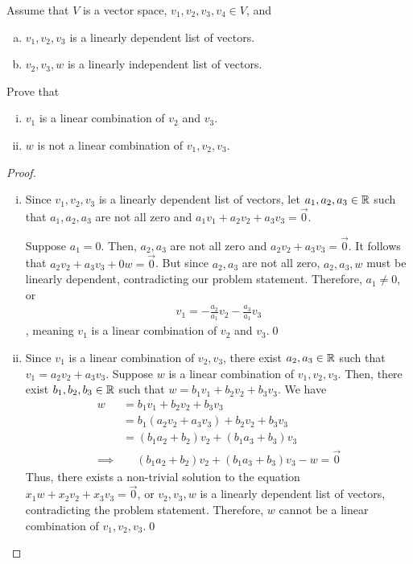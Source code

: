 \begin{question}
	\normalfont
	

	
	Assume that $V$ is a vector space, $v_1,v_2,v_3,v_4\in V$, and
	\begin{enumerate}[(a)]
		\item $v_1,v_2,v_3$ \hspace{.1cm} is a linearly dependent list of vectors.
		\item $v_2,v_3,w$ \hspace{.1cm} is a linearly independent list of vectors.
	\end{enumerate}
	Prove that
	\begin{enumerate}[(i)]
		\item $v_1$ is a linear combination of $v_2$ and $v_3$.
		\item $w$ is not a linear combination of $v_1, v_2, v_3$.
	\end{enumerate}

	
\end{question}
\renewcommand{\qedsymbol}{$\blacksquare$}
\begin{proof}
    \begin{enumerate}[(i)]
        \item Since $v_1,v_2,v_3$ is a linearly dependent list of vectors, let $a_1,a_2,a_3\in\mathbb R$ such that $a_1,a_2,a_3$ are not all zero and $a_1v_1+a_2v_2+a_3v_3=\vec{0}$.
        
        Suppose $a_1=0$. Then, $a_2,a_3$ are not all zero and $a_2v_2+a_3v_3=\vec{0}$. It follows that $a_2v_2+a_3v_3+0w=\vec{0}$. But since $a_2,a_3$ are not all zero, $a_2,a_3,w$ must be linearly dependent, contradicting our problem statement.
        Therefore, $a_1\not=0$, or 
        \[
            \begin{aligned}
                v_1=-\frac{a_2}{a_1}v_2-\frac{a_3}{a_1}v_3
            \end{aligned}
        \]
        , meaning $v_1$ is a linear combination of $v_2$ and $v_3$.\qed
        \item Since $v_1$ is a linear combination of $v_2,v_3$, there exist $a_2,a_3\in\mathbb R$ such that $v_1=a_2v_2+a_3v_3$.
        Suppose $w$ is a linear combination of $v_1,v_2,v_3$. Then, there exist $b_1,b_2,b_3\in\mathbb R$ such that $w=b_1v_1+b_2v_2+b_3v_3$. We have 
        \[
            \begin{aligned}
                w &= b_1v_1+b_2v_2+b_3v_3\\
                  &= b_1(a_2v_2+a_3v_3)+b_2v_2+b_3v_3\\
                  &= (b_1a_2+b_2)v_2+(b_1a_3+b_3)v_3\\
                \implies
                &\quad \ (b_1a_2+b_2)v_2+(b_1a_3+b_3)v_3-w=\vec{0}
            \end{aligned}
        \]  
        Thus, there exists a non-trivial solution to the equation $x_1w+x_2v_2+x_3v_3=\vec{0}$, or $v_2,v_3,w$ is a linearly dependent list of vectors, contradicting the problem statement. Therefore, $w$ cannot be a linear combination of $v_1,v_2,v_3$.\qed
    \end{enumerate}
    
    \renewcommand{\qedsymbol}{}
\end{proof}